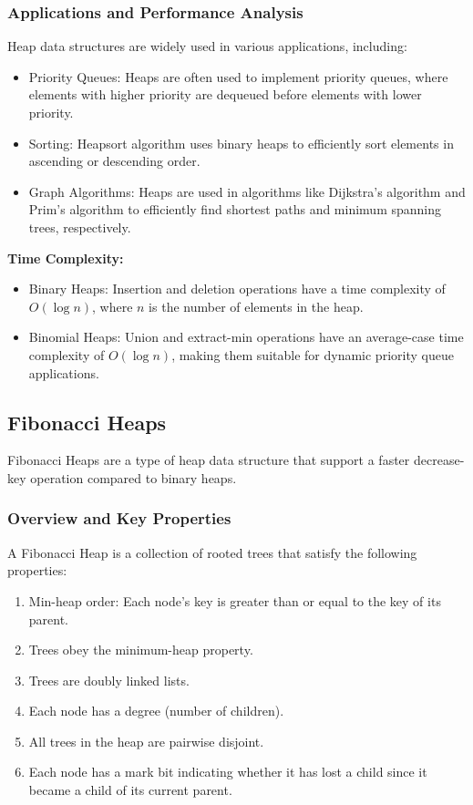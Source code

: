 \documentclass[12pt]{book} %
\begin{document}
\subsubsection{Applications and Performance Analysis}
Heap data structures are widely used in various applications, including:
\begin{itemize}
    \item Priority Queues: Heaps are often used to implement priority queues, where elements with higher priority are dequeued before elements with lower priority.
    \item Sorting: Heapsort algorithm uses binary heaps to efficiently sort elements in ascending or descending order.
    \item Graph Algorithms: Heaps are used in algorithms like Dijkstra's algorithm and Prim's algorithm to efficiently find shortest paths and minimum spanning trees, respectively.
\end{itemize}

\textbf{Time Complexity:}
\begin{itemize}
    \item Binary Heaps: Insertion and deletion operations have a time complexity of \(O(\log n)\), where \(n\) is the number of elements in the heap.
    \item Binomial Heaps: Union and extract-min operations have an average-case time complexity of \(O(\log n)\), making them suitable for dynamic priority queue applications.
\end{itemize}

\subsection{Fibonacci Heaps}
Fibonacci Heaps are a type of heap data structure that support a faster decrease-key operation compared to binary heaps.

\subsubsection{Overview and Key Properties}
A Fibonacci Heap is a collection of rooted trees that satisfy the following properties:
\begin{enumerate}
    \item Min-heap order: Each node's key is greater than or equal to the key of its parent.
    \item Trees obey the minimum-heap property.
    \item Trees are doubly linked lists.
    \item Each node has a degree (number of children).
    \item All trees in the heap are pairwise disjoint.
    \item Each node has a mark bit indicating whether it has lost a child since it became a child of its current parent.
\end{enumerate}
\end{document}
